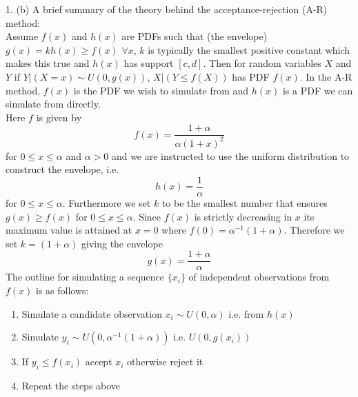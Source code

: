 1. (b) A brief summary of the theory behind the acceptance-rejection
(A-R) method:\\
Assume $f(x)$ and $h(x)$ are PDFs such that (the envelope)
$g(x)=kh(x)\ge f(x)$ $\forall x$, $k$ is typically the smallest
positive constant which makes this true
and $h(x)$ has support $[c,d]$. Then for random variables
$X$ and $Y$ if  $Y|(X=x) \sim U(0,g(x))$, $X|(Y\le f(X))$ has PDF
$f(x)$. In the A-R method, $f(x)$ is the PDF we wish to simulate from
and $h(x)$  is a PDF we can simulate from directly.\\
Here $f$ is given by
\begin{equation*}
  f(x) = \frac{1+\alpha}{\alpha(1+x)^2}
\end{equation*}
for $0\le x\le\alpha$ and $\alpha > 0$ and we are instructed to use
the uniform distribution to construct the envelope, i.e.
\begin{equation*}
  h(x) = \frac{1}{\alpha}
\end{equation*}
for $0\le x\le\alpha$. Furthermore we set $k$ to be the smallest
number that ensures $g(x)\ge f(x)$ for $0\le x\le\alpha$. Since $f(x)$
is strictly decreasing in $x$ its maximum value is attained at $x=0$ where
$f(0)=\alpha^{-1}(1+\alpha)$. Therefore we set $k=(1+\alpha)$ giving
the envelope
\begin{equation*}
  g(x) = \frac{1+\alpha}{\alpha}
\end{equation*}
The outline for simulating a sequence $\{x_i\}$ of independent observations from
$f(x)$ is as follows:
\begin{enumerate}
  \item Simulate a candidate observation $x_i \sim U(0,\alpha)$
    i.e. from $h(x)$
  \item Simulate $y_i \sim U(0,\alpha^{-1}(1+\alpha))$ i.e. $U(0,g(x_i))$

  \item If $y_i\le f(x_i)$ accept $x_i$ otherwise reject it
  \item Repeat the steps above
\end{enumerate}

